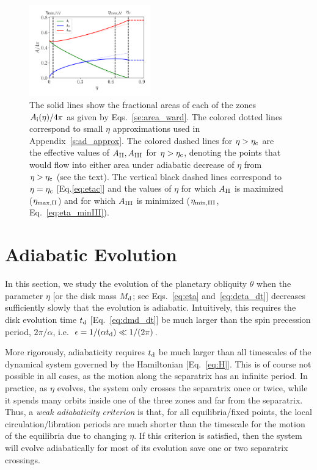 \documentclass[twocolumn,twocolappendix]{aastex63}
\begin{document}
\begin{figure}
    \centering
    \includegraphics[width=0.47\textwidth]{plots_diskdisp/1_areas.png}
    \caption{The solid lines show the fractional areas of each of the zones
    $A_{\rm i}(\eta) / 4\pi$ as given by Eqs.~\eqref{se:area_ward}. The colored
    dotted lines correspond to small $\eta$ approximations used in
    Appendix~\ref{s:ad_approx}. The colored dashed lines for $\eta > \eta_{\rm
    c}$ are the effective values of $A_{\rm II}, A_{\rm III}$ for $\eta >
    \eta_{\rm c}$, denoting the points that would flow into either area under
    adiabatic decrease of $\eta$ from $\eta > \eta_{\rm c}$ (see the text). The
    vertical black dashed lines correspond to $\eta = \eta_{\rm c}$
    [Eq.\eqref{eq:etac}] and the values of $\eta$ for which $A_{\rm II}$ is
    maximized ($\eta_{\rm \max, II}$) and for which $A_{\rm III}$ is minimized
    ($\eta_{\rm \min, III}$, Eq.~\eqref{eq:eta_minIII}).}\label{fig:eq_areas}
\end{figure}

\section{Adiabatic Evolution}\label{s:ad}

In this section, we study the evolution of the planetary obliquity $\theta$ when
the parameter $\eta$ [or the disk mass $M_{\rm d}$; see Eqs.~\eqref{eq:eta}
and~\eqref{eq:deta_dt}] decreases sufficiently slowly that the evolution is
adiabatic. Intuitively, this requires the disk evolution time
$t_{\rm d}$ [Eq.~\eqref{eq:dmd_dt}] be much larger than the spin precession
period, $2\pi / \alpha$, i.e.\ $\epsilon = 1 / (\alpha t_{\rm d}) \ll 1/
(2\pi)$.

More rigorously, adiabaticity requires $t_{\rm d}$ be much larger than all
timescales of the dynamical system governed by the Hamiltonian
[Eq.~\eqref{eq:H}]. This is of course not possible in all cases, as the motion
along the separatrix has an infinite period. In practice, as $\eta$ evolves, the
system only crosses the separatrix once or twice, while it spends many orbits
inside one of the three zones and far from the separatrix. Thus, a \emph{weak
adiabaticity criterion} is that, for all equilibria/fixed points, the local
circulation/libration periods are much shorter than the timescale for the motion
of the equilibria due to changing $\eta$. If this criterion is satisfied, then
the system will evolve adiabatically for most of its evolution save one or two
separatrix crossings.
\end{document}
